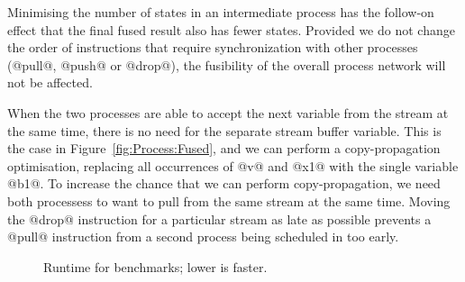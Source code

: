 Minimising the number of states in an intermediate process has the follow-on effect that the final fused result also has fewer states. Provided we do not change the order of instructions that require synchronization with other processes (@pull@, @push@ or @drop@), the fusibility of the overall process network will not be affected.


When the two processes are able to accept the next variable from the stream at the same time, there is no need for the separate stream buffer variable. This is the case in Figure~\ref{fig:Process:Fused}, and we can perform a copy-propagation optimisation, replacing all occurrences of @v@ and @x1@ with the single variable @b1@. To increase the chance that we can perform copy-propagation, we need both processess to want to pull from the same stream at the same time. Moving the @drop@ instruction for a particular stream as late as possible prevents a @pull@ instruction from a second process being scheduled in too early.




\begin{figure}
\caption{Runtime for benchmarks; lower is faster.}
\label{fig:bench:all}
\end{figure}


